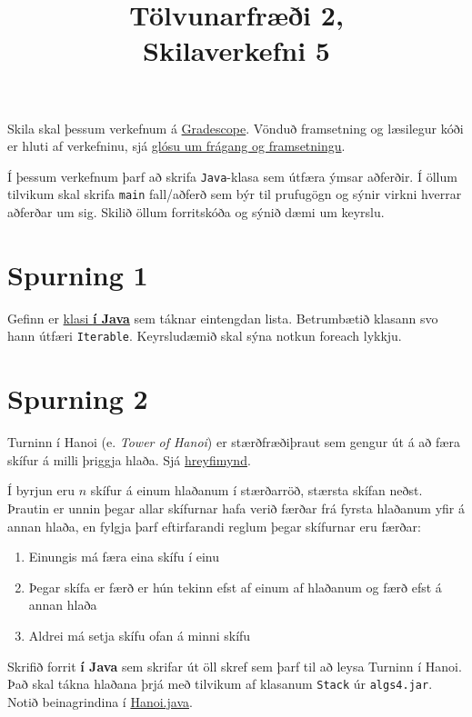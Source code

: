 \documentclass{article}
\title{Tölvunarfræði 2, \semester \\ Skilaverkefni 5}
\author{}
\begin{document}
\maketitle
{}

Skila skal þessum verkefnum á \href{https://gradescope.com/courses/5640}{Gradescope}. Vönduð framsetning og læsilegur kóði er hluti af verkefninu, sjá \href{https://piazza.com/class/ixkicfen49l111?cid=52}{glósu um frágang og framsetningu}.

Í þessum verkefnum þarf að skrifa \texttt{Java}-klasa sem útfæra ýmsar aðferðir. Í öllum tilvikum skal skrifa \texttt{main} fall/aðferð sem býr til prufugögn og sýnir virkni hverrar aðferðar um sig. Skilið öllum forritskóða og sýnið dæmi um keyrslu.

\section{Spurning 1}
Gefinn er \href{https://raw.githubusercontent.com/Ernir/kennsluefni/master/T2/Code/w5/SimpleSinglyLinkedList.java}{klasi \textbf{í Java}} sem táknar eintengdan lista. Betrumbætið klasann svo hann útfæri \texttt{Iterable}. Keyrsludæmið skal sýna notkun foreach lykkju.

\section{Spurning 2}
Turninn í Hanoi (e. \emph{Tower of Hanoi}) er stærðfræðiþraut sem gengur út á að færa skífur á milli þriggja hlaða. Sjá \href{https://www.tutorialspoint.com/data_structures_algorithms/images/tower_of_hanoi.gif}{hreyfimynd}.

Í byrjun eru $n$ skífur á einum hlaðanum í stærðarröð, stærsta skífan neðst. Þrautin er unnin þegar allar skífurnar hafa verið færðar frá fyrsta hlaðanum yfir á annan hlaða, en fylgja þarf eftirfarandi reglum þegar skífurnar eru færðar:
\begin{enumerate}
 \item Einungis má færa eina skífu í einu
 \item Þegar skífa er færð er hún tekinn efst af einum af hlaðanum og færð efst á annan hlaða
 \item Aldrei má setja skífu ofan á minni skífu
\end{enumerate}

Skrifið forrit \textbf{í Java} sem skrifar út öll skref sem þarf til að leysa Turninn í Hanoi. Það skal tákna hlaðana þrjá með tilvikum af klasanum \texttt{Stack} úr \texttt{algs4.jar}. Notið beinagrindina í \href{https://raw.githubusercontent.com/Ernir/kennsluefni/master/T2/Code/w5/Hanoi.java}{Hanoi.java}.
\end{document}
